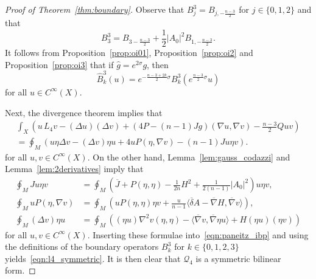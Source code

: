 \documentclass{amsart}
\theoremstyle{definition}
\theoremstyle{remark}
\numberwithin{equation}{section}
\begin{document}
\begin{proof}[Proof of Theorem~\ref{thm:boundary}]
 Observe that $B_j^3=B_{j,-\frac{n-3}{2}}$ for $j\in\{0,1,2\}$ and that
 \[ B_3^3 = B_{3-\frac{n-3}{2}} + \frac{1}{2}{\lvert} A_0{\rvert}^2B_{1,-\frac{n-3}{2}} . \]
 It follows from Proposition~\ref{prop:oi01}, Proposition~\ref{prop:oi2} and Proposition~\ref{prop:oi3} that if ${\widehat{g}}=e^{2\sigma}g$, then
 \[ {\widehat{B}}_k^3(u) = e^{-\frac{n-3+2k}{2}\sigma}B_k^3\left(e^{\frac{n-3}{2}\sigma}u\right) \]
 for all $u\in C^\infty(X)$.

 Next, the divergence theorem implies that
 \begin{multline}
  \label{eqn:paneitz_ibp}
  \int_X \left( u\,L_4v - (\Delta u)(\Delta v) + (4P-(n-1)Jg)(\nabla u,\nabla v) - \frac{n-3}{2}Quv\right) \\ = \oint_M \left(u\eta\Delta v - (\Delta v)\eta u + 4uP(\eta,\nabla v) - (n-1)Ju\eta v\right) .
 \end{multline}
 for all $u,v\in C^\infty(X)$.  On the other hand, Lemma~\ref{lem:gauss_codazzi} and Lemma~\ref{lem:2derivatives} imply that
 \begin{align}
  \label{eqn:pibp1} \oint_M Ju\eta v & = \oint_M \left({\overline{J}} + P(\eta,\eta) - \frac{1}{2n}H^2 + \frac{1}{2(n-1)}{\lvert} A_0{\rvert}^2\right)u\eta v, \\
  \label{eqn:pibp2} \oint_M uP(\eta,\nabla v) & = \oint_M \left(uP(\eta,\eta)\eta v + \frac{u}{n-1}{\langle}{\overline{\delta}} A - {\overline{\nabla}} H,{\overline{\nabla}} v{\rangle} \right), \\
  \label{eqn:pibp3} \oint_M (\Delta v)\eta u & = \oint_M \left( (\eta u)\nabla^2v(\eta,\eta) - {\langle}{\overline{\nabla}} v,{\overline{\nabla}}\eta u{\rangle} + H(\eta u)(\eta v)\right)
 \end{align}
 for all $u,v\in C^\infty(X)$.  Inserting these formulae into~\eqref{eqn:paneitz_ibp} and using the definitions of the boundary operators $B_k^3$ for $k\in\{0,1,2,3\}$ yields~\eqref{eqn:l4_symmetric}.  It is then clear that ${\mathcal{Q}}_4$ is a symmetric bilinear form.
\end{proof}
\end{document}
